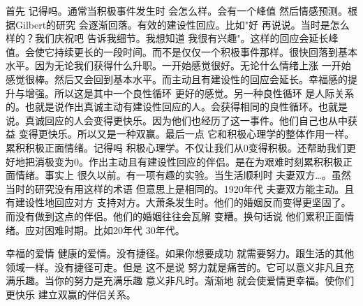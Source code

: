 首先 记得吗。通常当积极事件发生时 会怎么样。会有一个峰值 然后情感预测。根据Gilbert的研究 会逐渐回落。有效的建设性回应。比如"好 再说说。当时是怎么样的？我们庆祝吧 告诉我细节。我想知道 我很有兴趣"。这样的回应会延长峰值。会使它持续更长的一段时间。而不是仅仅一个积极事件那样。很快回落到基本水平。因为无论我们获得什么升职。一开始感觉很好。无论什么情绪上涨 一开始感觉很棒。然后又会回到基本水平。而主动且有建设性的回应会延长。幸福感的提升与增强。所以这是其中一个良性循环 更好的感觉。另一种良性循环 是人际关系的。也就是说作出真诚主动有建设性回应的人。会获得相同的良性循环。也就是说。真诚回应的人会变得更快乐。因为他们也经历了这一事件。他们自己也从中获益 变得更快乐。所以又是一种双赢。最后一点 它和积极心理学的整体作用一样。累积积极正面情绪。记得吗 积极心理学。不仅让我们从0变得积极。还帮助我们更好地把消极变为0。作出主动且有建设性回应的伴侣。是在为艰难时刻累积积极正面情绪。事实上 很久以前。有一项有趣的实验。当生活顺利时 夫妻双方…。虽然当时的研究没有用这样的术语 但意思上是相同的。1920年代 夫妻双方能主动。且有建设性地回应对方 支持对方。大萧条发生时。他们的婚姻反而变得更坚固了。而没有做到这点的伴侣。他们的婚姻往往会瓦解 变糟。换句话说 他们累积正面情绪。应对困难时期。比如20年代 30年代。 

幸福的爱情 健康的爱情。没有捷径。如果你想要成功 就需要努力。跟生活的其他领域一样。没有捷径可走。但是 这不是说 努力就是痛苦的。它可以意义非凡且充满乐趣。当你的努力是充满乐趣 意义非凡时。渐渐地 就会使爱情更幸福。使你们更快乐 建立双赢的伴侣关系。 

